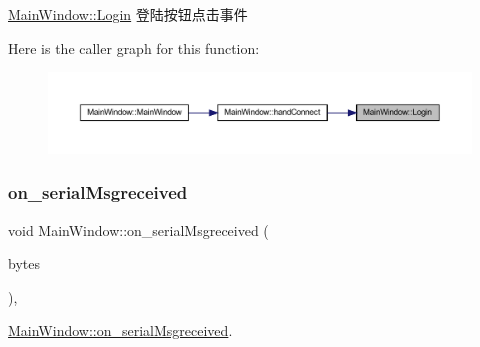 \mbox{\hyperlink{class_main_window_a27370c71ccd518528509731b5d19e904}{Main\+Window\+::\+Login}} 登陆按钮点击事件 

Here is the caller graph for this function\+:
\nopagebreak
\begin{figure}[H]
\begin{center}
\leavevmode
\includegraphics[width=350pt]{class_main_window_a27370c71ccd518528509731b5d19e904_icgraph}
\end{center}
\end{figure}
\mbox{\label{class_main_window_a13d0382dd96e94f56a05300323d278da}} 
\subsubsection{\texorpdfstring{on\_serialMsgreceived}{on\_serialMsgreceived}}
{\footnotesize\ttfamily void Main\+Window\+::on\+\_\+serial\+Msgreceived (\begin{DoxyParamCaption}\item[{Q\+Byte\+Array}]{bytes }\end{DoxyParamCaption})\hspace{0.3cm}{\ttfamily [private]}, {\ttfamily [slot]}}



\mbox{\hyperlink{class_main_window_a13d0382dd96e94f56a05300323d278da}{Main\+Window\+::on\+\_\+serial\+Msgreceived}}. 


